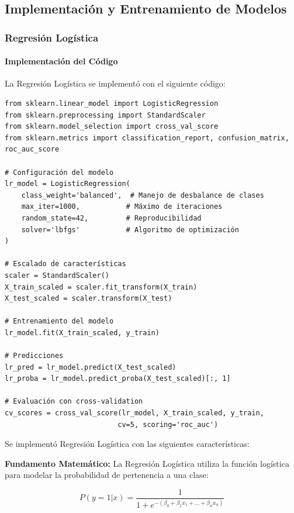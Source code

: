\documentclass[12pt,letterpaper]{article}
\begin{document}
\subsection{Implementación y Entrenamiento de Modelos}

\subsubsection{Regresión Logística}

\paragraph{Implementación del Código}

La Regresión Logística se implementó con el siguiente código:

\begin{verbatim}
from sklearn.linear_model import LogisticRegression
from sklearn.preprocessing import StandardScaler
from sklearn.model_selection import cross_val_score
from sklearn.metrics import classification_report, confusion_matrix, roc_auc_score

# Configuración del modelo
lr_model = LogisticRegression(
    class_weight='balanced',  # Manejo de desbalance de clases
    max_iter=1000,           # Máximo de iteraciones
    random_state=42,         # Reproducibilidad
    solver='lbfgs'           # Algoritmo de optimización
)

# Escalado de características
scaler = StandardScaler()
X_train_scaled = scaler.fit_transform(X_train)
X_test_scaled = scaler.transform(X_test)

# Entrenamiento del modelo
lr_model.fit(X_train_scaled, y_train)

# Predicciones
lr_pred = lr_model.predict(X_test_scaled)
lr_proba = lr_model.predict_proba(X_test_scaled)[:, 1]

# Evaluación con cross-validation
cv_scores = cross_val_score(lr_model, X_train_scaled, y_train, 
                           cv=5, scoring='roc_auc')
\end{verbatim}

Se implementó Regresión Logística con las siguientes características:

\textbf{Fundamento Matemático:}
La Regresión Logística utiliza la función logística para modelar la probabilidad de pertenencia a una clase:

\begin{equation}
P(y=1|x) = \frac{1}{1 + e^{-(\beta_0 + \beta_1x_1 + ... + \beta_nx_n)}}
\end{equation}
\end{document}
